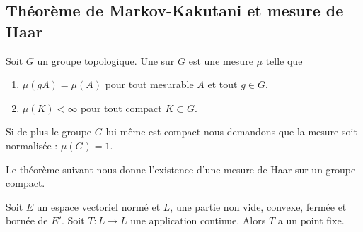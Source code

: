 \subsection{Théorème de Markov-Kakutani et mesure de Haar}

\begin{definition}
    Soit \( G\) un groupe topologique. Une  sur \( G\) est une mesure \( \mu\) telle que 
    \begin{enumerate}
        \item
            \( \mu(gA)=\mu(A)\) pour tout mesurable \( A\) et tout \( g\in G\),
        \item
            \( \mu(K)<\infty\) pour tout compact \( K\subset G\).
    \end{enumerate}
    Si de plus le groupe \( G\) lui-même est compact nous demandons que la mesure soit normalisée : \( \mu(G)=1\).
\end{definition}

Le théorème suivant nous donne l'existence d'une mesure de Haar sur un groupe compact.
\begin{theorem}   \label{ThoeJCdMP}
    Soit \( E\) un espace vectoriel normé et \( L\), une partie non vide, convexe, fermée et bornée de \( E'\). Soit \( T\colon L\to L\) une application continue. Alors \( T\) a un point fixe.
\end{theorem}

